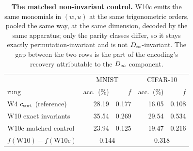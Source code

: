 \begin{table}[t]
\centering\small
\caption{\textbf{The matched non-invariant control.} W10c emits the same monomials in $(w,u)$ at the same trigonometric orders, pooled the same way, at the same dimension, decoded by the same apparatus; only the parity classes differ, so it stays exactly permutation-invariant and is not $D_\infty$-invariant. The gap between the two rows is the part of the encoding's recovery attributable to the $D_\infty$ component.}
\label{tab:control}
\begin{tabular}{@{}lrrrr@{}}
\toprule
 & \multicolumn{2}{c}{MNIST} & \multicolumn{2}{c}{CIFAR-10} \\
rung & acc.\ (\%) & $f$ & acc.\ (\%) & $f$ \\
\midrule
W4 $c_{\mathrm{sort}}$ (reference) & 28.19 & 0.177 & 16.05 & 0.108 \\
W10 exact invariants & 35.54 & 0.269 & 29.54 & 0.534 \\
W10c matched control & 23.94 & 0.125 & 19.47 & 0.216 \\
\midrule
$f(\mathrm{W10}) - f(\mathrm{W10c})$ & \multicolumn{2}{c}{0.144} & \multicolumn{2}{c}{0.318} \\
\bottomrule
\end{tabular}
\end{table}
